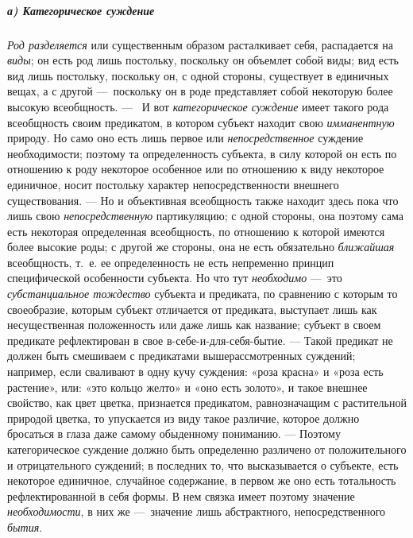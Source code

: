 \documentclass[twoside]{article}
\begin{document}
{{\subparagraph[а) Категорическое суждение]{а) Категорическое суждение}
{\em Род разделяется} или
существенным образом расталкивает себя, распадается на
{\em виды}; он есть род
лишь постольку, поскольку он объемлет собой виды; вид есть вид лишь
постольку, поскольку он, с одной стороны, существует в единичных вещах, а с
другой —~поскольку он в роде представляет собой некоторую
более высокую всеобщность. — \ И вот
{\em категорическое суждение}
имеет такого рода всеобщность своим предикатом, в котором
субъект находит свою {\em имманентную}
природу. Но само оно есть лишь первое или
{\em непосредственное}
суждение необходимости; поэтому та определенность субъекта, в
силу которой он есть по отношению к роду некоторое особенное или по
отношению к виду некоторое единичное, носит постольку характер
непосредственности внешнего существования. — Но и
объективная всеобщность также находит здесь пока что лишь
свою {\em непосредственную}
партикуляцию; с одной стороны, она поэтому сама есть
некоторая определенная всеобщность, по отношению к которой имеются более
высокие роды; с другой же стороны, она не есть обязательно
{\em ближайшая}
всеобщность, т.~е. ее определенность не есть непременно
принцип специфической особенности субъекта. Но что тут
{\em необходимо} —~это
{\em субстанциальное тождество}
субъекта и предиката, по сравнению с которым то своеобразие,
которым субъект отличается от предиката, выступает лишь как несущественная
положенность или даже лишь как название; субъект в своем предикате
рефлектирован в свое в-себе-и-для-себя-бытие. — Такой
предикат не должен быть смешиваем с предикатами вышерассмотренных суждений;
например, если сваливают в одну кучу суждения:
«роза красна» и
«роза есть растение»,
или:
«это кольцо желто» и
«оно есть золото»,
и такое внешнее свойство, как цвет цветка, признается
предикатом, равнозначащим с растительной природой цветка, то упускается из
виду такое различие, которое должно бросаться в глаза даже самому
обыденному пониманию. — Поэтому категорическое суждение
должно быть определенно различено от положительного и отрицательного
суждений; в последних то, что высказывается о субъекте, есть некоторое
единичное, случайное содержание, в первом же оно есть тотальность
рефлектированной в себя формы. В нем связка имеет поэтому значение
{\em необходимости}, в
них же —~значение лишь абстрактного, непосредственного
{\em бытия}.

}}
\end{document}
